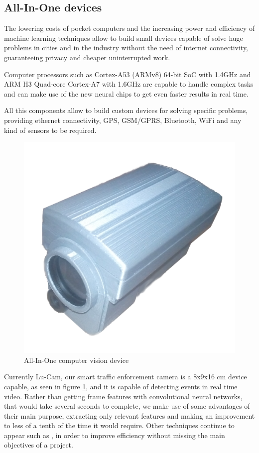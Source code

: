 \documentclass[fleqn,12pt]{SelfArx} %
\begin{document}
\subsection{All-In-One devices}

The lowering costs of pocket computers and the increasing power and efficiency of machine learning techniques allow to build small devices capable of solve huge problems in cities and in the industry without the need of internet connectivity, guaranteeing privacy and cheaper uninterrupted work.

Computer processors such as Cortex-A53 (ARMv8) 64-bit SoC with 1.4GHz and ARM H3 Quad-core Cortex-A7 with 1.6GHz are capable to handle complex tasks and can make use of the new neural chips to get even faster results in real time.

All this components allow to build custom devices for solving specific problems, providing ethernet connectivity, GPS, GSM/GPRS, Bluetooth, WiFi and any kind of sensors to be required.

\begin{figure}[t]\centering
	\includegraphics[width=0.8\linewidth]{images/lucam_005}
	\caption{All-In-One computer vision device}
	\label{fig:device}
\end{figure}

Currently Lu-Cam, our smart traffic enforcement camera is a 8x9x16 cm device capable, as seen in figure \ref{fig:device}, and it is capable of detecting events in real time video. Rather than getting frame features with convolutional neural networks, that would take several seconds to complete, we make use of some advantages of their main purpose, extracting only relevant features and making an improvement to less of a tenth of the time it would require. Other techniques continue to appear such as \cite{Cavigelli:2017:CCI:3131885.3131906}, in order to improve efficiency without missing the main objectives of a project.
\end{document}
